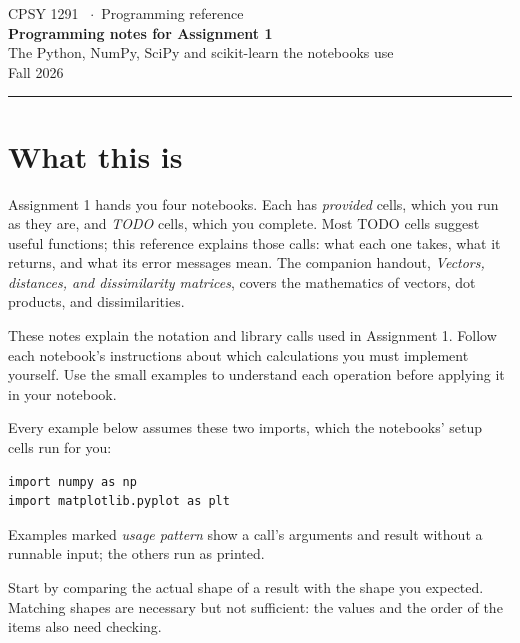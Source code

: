 \documentclass[11pt]{article}
\begin{document}
\begin{center}
{\sffamily\small\color{accent}CPSY 1291 \ $\cdot$\ Programming reference}\\[5pt]
{\sffamily\LARGE\bfseries\color{brown} Programming notes for Assignment 1}\\[3pt]
{\sffamily\large\color{ink} The Python, NumPy, SciPy and scikit-learn the notebooks use}\\[6pt]
{\color{lightgray}\small Fall 2026}
\end{center}
\vspace{4pt}\hrule\vspace{10pt}

\section*{What this is}

Assignment 1 hands you four notebooks. Each has \emph{provided} cells, which you run as
they are, and \emph{TODO} cells, which you complete. Most TODO cells suggest useful
functions; this reference explains those calls: what each one takes, what it returns, and
what its error messages mean. The companion handout, \emph{Vectors, distances, and
dissimilarity matrices}, covers the mathematics of vectors, dot products, and
dissimilarities.

These notes explain the notation and library calls used in Assignment 1. Follow each
notebook's instructions about which calculations you must implement yourself. Use the
small examples to understand each operation before applying it in your notebook.

Every example below assumes these two imports, which the notebooks' setup cells run for you:
\begin{codebox}
\begin{verbatim}
import numpy as np
import matplotlib.pyplot as plt
\end{verbatim}
\end{codebox}

Examples marked \emph{usage pattern} show a call's arguments and result without a runnable
input; the others run as printed.

\begin{keybox}
 Start by comparing the actual shape of a result with the shape
you expected. Matching shapes are necessary but not sufficient: the values and the order
of the items also need checking.
\end{keybox}
\end{document}
